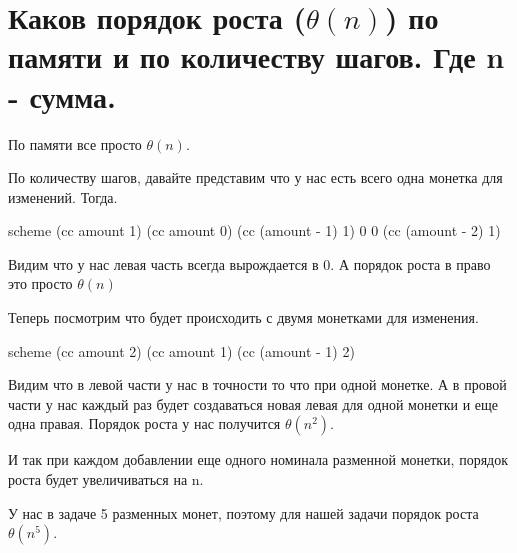 \section{Каков порядок роста ($\theta(n)$) по памяти и по количеству шагов. Где n - сумма.}

По памяти все просто $\theta(n)$.

По количеству шагов, давайте представим что у нас есть всего одна монетка для изменений. Тогда.

\begin{codelisting}{scheme}
        (cc amount 1)
  (cc amount 0)  (cc (amount - 1) 1)
0                0     (cc (amount - 2) 1)
\end{codelisting}

Видим что у нас левая часть всегда вырождается в 0. А порядок роста в право это просто $\theta(n)$

Теперь посмотрим что будет происходить с двумя монетками для изменения.

\begin{codelisting}{scheme}
        (cc amount 2)
  (cc amount 1)  (cc (amount - 1) 2)
\end{codelisting}

Видим что в левой части у нас в точности то что при одной монетке. А в провой части у нас каждый раз будет создаваться новая левая для одной монетки и еще одна правая. Порядок роста у нас получится $\theta(n^2)$.

И так при каждом добавлении еще одного номинала разменной монетки, порядок роста будет увеличиваться на n.

У нас в задаче 5 разменных монет, поэтому для нашей задачи порядок роста $\theta(n^5)$.